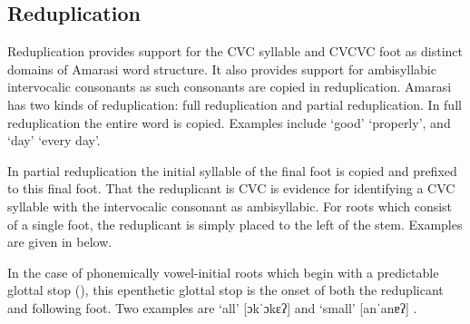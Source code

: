 \subsection{Reduplication}\label{sec:Red}
Reduplication provides support for
the CVC syllable and CVCVC foot as distinct domains of Amarasi word structure.
It also provides support for ambisyllabic intervocalic consonants
as such consonants are copied in reduplication.
Amarasi has two kinds of reduplication: full reduplication and partial reduplication.
In full reduplication the entire word is copied.
Examples include  `good' {\ra}  `properly',
and  `day' {\ra}  `every day'.

In partial reduplication the initial
syllable of the final foot is copied and prefixed to this final foot.
That the reduplicant is CVC is evidence for identifying a CVC syllable
with the intervocalic consonant as ambisyllabic.
For roots which consist of a single foot,
the reduplicant is simply placed to the left of the stem.
Examples are given in  below.

\begin{exe}
	\label{ex:ParRed}
\end{exe}

In the case of phonemically vowel-initial roots
which begin with a predictable glottal stop (),
this epenthetic glottal stop is the onset of both the reduplicant and following foot.
Two examples are  `all' {\ra}
[ɔkˈɔkɛʔ] {}
and  `small' {\ra} [anˈanɐʔ] {}.

